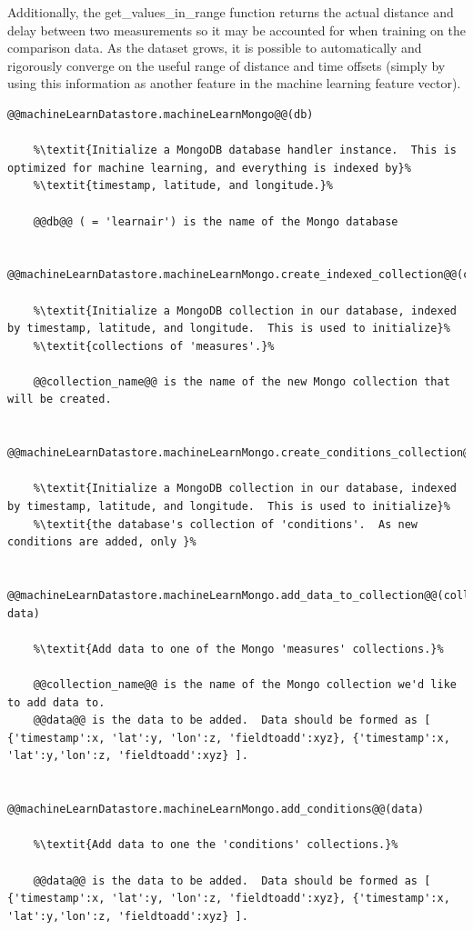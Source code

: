 Additionally, the get\_values\_in\_range function returns the actual distance and delay between two measurements so it may be accounted for when training on the comparison data.  As the dataset grows, it is possible to automatically and rigorously converge on the useful range of distance and time offsets (simply by using this information as another feature in the machine learning feature vector).

\begin{lstlisting}[style=codedef]
@@machineLearnDatastore.machineLearnMongo@@(db)
	
	%\textit{Initialize a MongoDB database handler instance.  This is optimized for machine learning, and everything is indexed by}%
	%\textit{timestamp, latitude, and longitude.}%

	@@db@@ ( = 'learnair') is the name of the Mongo database
	

@@machineLearnDatastore.machineLearnMongo.create_indexed_collection@@(collection_name)
	
	%\textit{Initialize a MongoDB collection in our database, indexed by timestamp, latitude, and longitude.  This is used to initialize}%
	%\textit{collections of 'measures'.}%

	@@collection_name@@ is the name of the new Mongo collection that will be created.
	

@@machineLearnDatastore.machineLearnMongo.create_conditions_collection@@(collection_name)
	
	%\textit{Initialize a MongoDB collection in our database, indexed by timestamp, latitude, and longitude.  This is used to initialize}%
 	%\textit{the database's collection of 'conditions'.  As new conditions are added, only }%


@@machineLearnDatastore.machineLearnMongo.add_data_to_collection@@(collection_name, data)
	
	%\textit{Add data to one of the Mongo 'measures' collections.}%

	@@collection_name@@ is the name of the Mongo collection we'd like to add data to.
	@@data@@ is the data to be added.  Data should be formed as [ {'timestamp':x, 'lat':y, 'lon':z, 'fieldtoadd':xyz}, {'timestamp':x, 'lat':y,'lon':z, 'fieldtoadd':xyz} ].
	

@@machineLearnDatastore.machineLearnMongo.add_conditions@@(data)
	
	%\textit{Add data to one the 'conditions' collections.}%

	@@data@@ is the data to be added.  Data should be formed as [ {'timestamp':x, 'lat':y, 'lon':z, 'fieldtoadd':xyz}, {'timestamp':x, 'lat':y,'lon':z, 'fieldtoadd':xyz} ].



\end{lstlisting}
